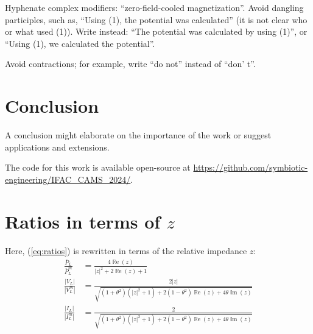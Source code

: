 \documentclass{ifacconf}
\renewcommand{\Re}{\operatorname{\mathbb{R}e}}
\renewcommand{\Im}{\operatorname{\mathbb{I}m}}
\begin{document}
Hyphenate complex modifiers:
``zero-field-cooled magnetization''. Avoid dangling participles, such
as, ``Using (1), the potential was calculated'' (it is not clear who or
what used (1)). Write instead: ``The potential was calculated by using
(1)'', or ``Using (1), we calculated the potential''.

Avoid contractions;
for example, write ``do not'' instead of ``don' t''. 


\section{Conclusion}

A conclusion might elaborate on the importance of the work
or suggest applications and extensions.

The code for this work is available open-source at \url{https://github.com/symbiotic-engineering/IFAC_CAMS_2024/}.




\appendix
\section{Ratios in terms of $z$}    %
Here, (\ref{eq:ratios}) is rewritten in terms of the relative impedance $z$:
\begin{equation}\label{eq:ratios-z}
\begin{aligned}
     \frac{\overline{P}_L}{\overline{P}_L^m} &= \frac{4 \Re(z)}{|z|^2 + 2 \Re(z) + 1} \\
     \frac{|V_L|}{|V_L^m|} &= \frac{2 |z|}{\sqrt{(1+\theta^2)(|z|^2+1) + 2(1-\theta^2)\Re(z) + 4 \theta \Im(z)  }} \\
     \frac{|I_L|}{|I_L^m|} &= \frac{2}{\sqrt{(1+\theta^2)(|z|^2+1) + 2(1-\theta^2)\Re(z) + 4 \theta \Im(z)  }}
\end{aligned}
\end{equation}
\end{document}
